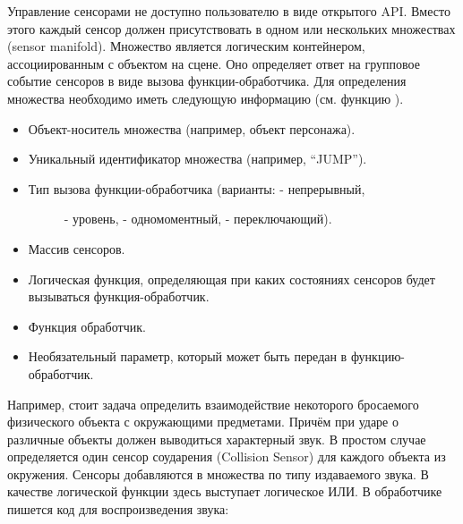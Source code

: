 \documentclass[a4paper,12pt,oneside]{sphinxmanual}
\begin{document}
Управление сенсорами не доступно пользователю в виде открытого API. Вместо этого
каждый сенсор должен присутствовать в одном или нескольких множествах (sensor
manifold). Множество является логическим контейнером, ассоциированным с объектом на сцене.
Оно определяет ответ на групповое событие сенсоров в виде вызова
функции-обработчика. Для определения множества необходимо иметь
следующую информацию (см. функцию ).
\begin{itemize}
\item {} 
Объект-носитель множества (например, объект персонажа).

\item {} 
Уникальный идентификатор множества (например, ``JUMP'').

\item {} \begin{description}
\item[{Тип вызова функции-обработчика (варианты:  - непрерывный,}] \leavevmode
{} - уровень,  - одномоментный,  - переключающий).

\end{description}

\item {} 
Массив сенсоров.

\item {} 
Логическая функция, определяющая при каких состояниях сенсоров будет
вызываться функция-обработчик.

\item {} 
Функция обработчик.

\item {} 
Необязательный параметр, который может быть передан в функцию-обработчик.

\end{itemize}

Например, стоит задача определить взаимодействие некоторого бросаемого
физического объекта с окружающими предметами. Причём при ударе о различные
объекты должен выводиться характерный звук. В простом случае определяется один
сенсор соударения (Collision Sensor) для каждого объекта из окружения. Сенсоры
добавляются в множества по типу издаваемого звука. В качестве логической функции
здесь выступает логическое ИЛИ. В обработчике пишется код для воспроизведения
звука:
\end{document}
